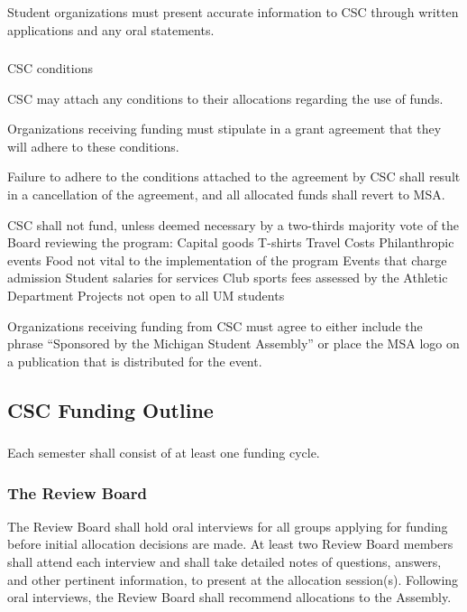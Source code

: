 \subsubsection{}
Student organizations must present accurate information to CSC through written applications and any oral statements.

\subsubsection{}
CSC conditions

\subsubsubsection{}
CSC may attach any conditions to their allocations regarding the use of funds.

\subsubsubsection{}
Organizations receiving funding must stipulate in a grant agreement that they will adhere to these conditions.

\subsubsubsection{}
Failure to adhere to the conditions attached to the agreement by CSC shall result in a cancellation of the agreement, and all allocated funds shall revert to MSA. 

\subsubsubsection{}
CSC shall not fund, unless deemed necessary by a two-thirds majority vote of the Board reviewing the program:
\subsubsubsubsection{}
Capital goods
\subsubsubsubsection{}
T-shirts
\subsubsubsubsection{}
Travel Costs
\subsubsubsubsection{}
Philanthropic events
\subsubsubsubsection{}
Food not vital to the implementation of the program
\subsubsubsubsection{}
Events that charge admission
\subsubsubsubsection{}
Student salaries for services
\subsubsubsubsection{}
Club sports fees assessed by the Athletic Department
\subsubsubsubsection{}
Projects not open to all UM students

\subsubsubsection{}
Organizations receiving funding from CSC must agree to either include the phrase “Sponsored by the Michigan Student Assembly” or place the MSA logo on a publication that is distributed for the event.

\subsection{CSC Funding Outline}
\subsubsection{}
Each semester shall consist of at least one funding cycle.

\subsubsection{The Review Board}
\subsubsubsection{}
The Review Board shall hold oral interviews for all groups applying for funding before initial allocation decisions are made.
\subsubsubsection{}
At least two Review Board members shall attend each interview and shall take detailed notes of questions, answers, and other pertinent information, to present at the allocation session(s).
\subsubsubsection{}
Following oral interviews, the Review Board shall recommend allocations to the Assembly.

